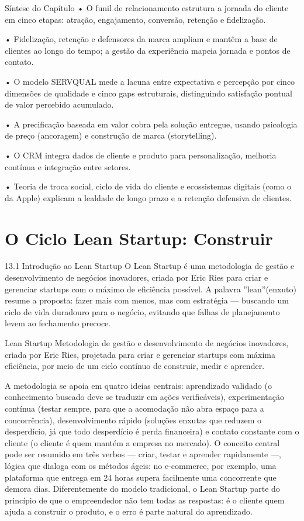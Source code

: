 Síntese do Capítulo • O funil de relacionamento estrutura a jornada do cliente em cinco etapas: atração, engajamento, conversão, retenção e fidelização.

• Fidelização, retenção e defensores da marca ampliam e mantêm a base de clientes ao longo do tempo; a gestão da experiência mapeia jornada e pontos de contato.

• O modelo SERVQUAL mede a lacuna entre expectativa e percepção por cinco dimensões de qualidade e cinco gaps estruturais, distinguindo satisfação pontual de valor percebido acumulado.

• A precificação baseada em valor cobra pela solução entregue, usando psicologia de preço (ancoragem) e construção de marca (storytelling).

• O CRM integra dados de cliente e produto para personalização, melhoria contínua e integração entre setores.

• Teoria de troca social, ciclo de vida do cliente e ecossistemas digitais (como o da Apple) explicam a lealdade de longo prazo e a retenção defensiva de clientes.

\chapter{O Ciclo Lean Startup: Construir}

13.1 Introdução ao Lean Startup O Lean Startup é uma metodologia de gestão e desenvolvimento de negócios inovadores, criada por Eric Ries para criar e gerenciar startups com o máximo de eficiência possível. A palavra ”lean”(enxuto) resume a proposta: fazer mais com menos, mas com estratégia — buscando um ciclo de vida duradouro para o negócio, evitando que falhas de planejamento levem ao fechamento precoce.

Lean Startup Metodologia de gestão e desenvolvimento de negócios inovadores, criada por Eric Ries, projetada para criar e gerenciar startups com máxima eficiência, por meio de um ciclo contínuo de construir, medir e aprender.

A metodologia se apoia em quatro ideias centrais: aprendizado validado (o conhecimento buscado deve se traduzir em ações verificáveis), experimentação contínua (testar sempre, para que a acomodação não abra espaço para a concorrência), desenvolvimento rápido (soluções enxutas que reduzem o desperdício, já que todo desperdício é perda financeira) e contato constante com o cliente (o cliente é quem mantém a empresa no mercado). O conceito central pode ser resumido em três verbos — criar, testar e aprender rapidamente —, lógica que dialoga com os métodos ágeis: no e-commerce, por exemplo, uma plataforma que entrega em 24 horas supera facilmente uma concorrente que demora dias. Diferentemente do modelo tradicional, o Lean Startup parte do princípio de que o empreendedor não tem todas as respostas: é o cliente quem ajuda a construir o produto, e o erro é parte natural do aprendizado.

